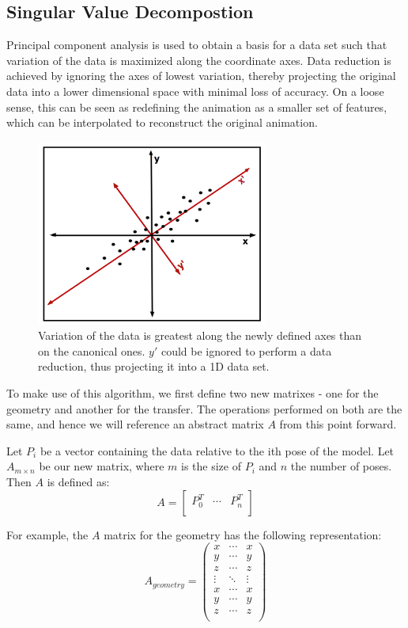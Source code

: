 \documentclass[annual]{acmsiggraph}
\begin{document}
\subsection{Singular Value Decompostion}

Principal component analysis is used to obtain a basis for a data set such that variation of the data is maximized along the coordinate axes. Data reduction is achieved by ignoring the axes of lowest variation, thereby projecting the original data into a lower dimensional space with minimal loss of accuracy. On a loose sense, this can be seen as redefining the animation as a smaller set of features, which can be interpolated to reconstruct the original animation.

\begin{figure}[ht]
  \centering
  \includegraphics[width=3in]{images/clusters.png}
  \caption{Variation of the data is greatest along the newly defined axes than on the canonical ones. $y'$ could be ignored to perform a data reduction, thus projecting it into a 1D data set.}
\end{figure}

To make use of this algorithm, we first define two new matrixes - one for the geometry and another for the transfer. The operations performed on both are the same, and hence we will reference an abstract matrix $A$ from this point forward.

Let $P_{i}$ be a vector containing the data relative to the ith pose of the model. Let $A_{m \times n}$ be our new matrix, where $m$ is the size of $P_{i}$ and $n$ the number of poses. Then $A$ is defined as:
\begin{equation}
	A = \begin{bmatrix}
		P_{0}^{T} & \cdots & P_{n}^{T} \\
	\end{bmatrix}
\end{equation}

For example, the $A$ matrix for the geometry has the following representation:
\begin{equation}
	A_{geometry} = \begin{pmatrix}
		x & \cdots & x \\
		y & \cdots & y \\
		z & \cdots & z \\
		\vdots & \ddots & \vdots \\
		x & \cdots & x \\
		y & \cdots & y \\
		z & \cdots & z \\
	\end{pmatrix}
\end{equation}
\end{document}
